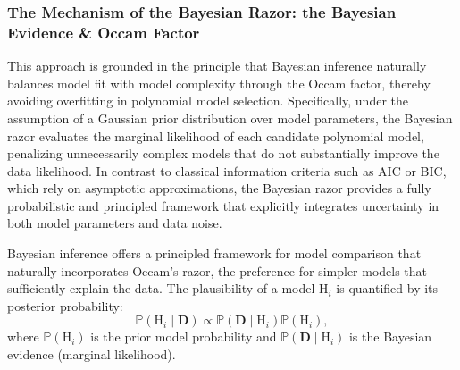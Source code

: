 \subsubsection{The Mechanism of the Bayesian Razor: the Bayesian Evidence \& Occam Factor}

This approach is grounded in the principle that Bayesian inference naturally balances model fit with model complexity through the Occam factor, thereby avoiding overfitting in polynomial model selection. 
Specifically, under the assumption of a Gaussian prior distribution over model parameters, the Bayesian razor evaluates the marginal likelihood of each candidate polynomial model, penalizing unnecessarily complex models that do not substantially improve the data likelihood. 
In contrast to classical information criteria such as AIC or BIC, which rely on asymptotic approximations, the Bayesian razor provides a fully probabilistic and principled framework that explicitly integrates uncertainty in both model parameters and data noise. 

Bayesian inference offers a principled framework for model comparison that naturally incorporates Occam's razor, the preference for simpler models that sufficiently explain the data. The plausibility of a model $\mathrm{H}_i$ is quantified by its posterior probability:
\begin{equation}
\mathbb{P}(\mathrm{H}_i \mid \mathbf{D}) \propto \mathbb{P}(\mathbf{D} \mid \mathrm{H}_i) \mathbb{P}(\mathrm{H}_i),
\end{equation}
where $\mathbb{P}(\mathrm{H}_i)$ is the prior model probability and $\mathbb{P}(\mathbf{D} \mid \mathrm{H}_i)$ is the Bayesian evidence (marginal likelihood).

